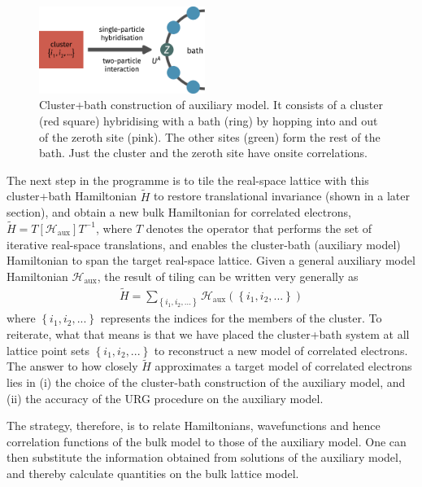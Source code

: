 \documentclass[reprint,hidelinks]{revtex4-2}
\begin{document}
\begin{figure}[!htb]
 	\centering
 	\includegraphics[width=0.48\textwidth]{gen_siam.pdf}
 	\caption{Cluster+bath construction of auxiliary model. It consists of a cluster (red square) hybridising with a bath (ring) by hopping into and out of the zeroth site (pink). The other sites (green) form the rest of the bath. Just the cluster and the zeroth site have onsite correlations.}
 \end{figure}
 The next step in the programme is to tile the real-space lattice with this cluster+bath Hamiltonian \(\tilde H\) to restore translational invariance (shown in a later section), and obtain a new bulk Hamiltonian for correlated electrons, $\tilde H = T\left[ \mathcal{H}_\text{aux} \right] T^{-1}$, where $T$ denotes the operator that performs the set of iterative real-space translations, and enables the cluster-bath (auxiliary model) Hamiltonian to span the target real-space lattice. Given a general auxiliary model Hamiltonian \(\mathcal{H}_\text{aux}\), the result of tiling can be written very generally as
 \begin{equation}\begin{aligned}
	 \tilde H = \sum_{\left\{i_1,i_2,...\right\}} \mathcal{H}_\text{aux}\left(\left\{i_1,i_2,...\right\}\right)
 \end{aligned}\end{equation}
where \(\left\{i_1,i_2,...\right\}\) represents the indices for the members of the cluster. To reiterate, what that means is that we have placed the cluster+bath system at all lattice point sets \(\left\{i_1,i_2,...\right\}\) to reconstruct a new model of correlated electrons. The answer to how closely $\tilde H$ approximates a target model of correlated electrons lies in (i) the choice of the cluster-bath construction of the auxiliary model, and (ii) the accuracy of the URG procedure on the auxiliary model.

The strategy, therefore, is to relate Hamiltonians, wavefunctions and hence correlation functions of the bulk model to those of the auxiliary model. One can then substitute the information obtained from solutions of the auxiliary model, and thereby calculate quantities on the bulk lattice model.
\end{document}
